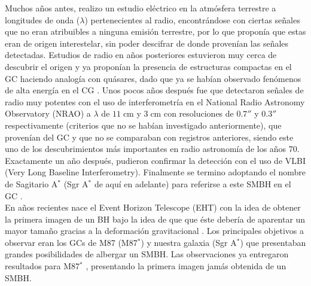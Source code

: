 \documentclass[11pt,letterpaper]{article}
\begin{document}
Muchos años antes, \cite{jansky1933electrical} realizo un estudio eléctrico en la atmósfera terrestre a longitudes de onda ($\lambda$) pertenecientes al radio, encontrándose con ciertas señales que no eran atribuibles a ninguna emisión terrestre, por lo que proponía que estas eran de origen interestelar, sin poder descifrar de donde provenían las señales detectadas. Estudios de radio en años posteriores estuvieron muy cerca de descubrir el origen \citep{clark, minley} y ya proponían la presencia de estructuras compactas en el GC haciendo analogía con quásares, dado que ya se habían observado fenómenos de alta energía en el CG \citep{lynden, lyndenress}. Unos pocos años después fue que \cite{balick1974intense} detectaron señales de radio muy potentes con el uso de interferometría en el National Radio Astronomy Observatory (NRAO) a $\lambda$ de $11\;\text{cm}$ y $3\;\text{cm}$ con resoluciones de $0.7''$ y $0.3''$ respectivamente (criterios que no se habían investigado anteriormente), que provenían del GC y que no se comparaban con registros anteriores, siendo este uno de los descubrimientos más importantes en radio astronomía de los años 70. Exactamente un año después, \cite{lo1} pudieron confirmar la detección con el uso de VLBI (Very Long Baseline Interferometry). Finalmente se termino adoptando el nombre de Sagitario A$^*$ (Sgr A$^*$ de aquí en adelante) para referirse a este SMBH en el GC \citep{brownestrella}.\\
En años recientes nace el Event Horizon Telescope (EHT) con la idea de obtener la primera imagen de un BH bajo la idea de que que éste debería de aparentar un mayor tamaño gracias a la deformación gravitacional \citep{campbell}. Los principales objetivos a observar eran los GCs de M87 (M87$^*$) y nuestra galaxia (Sgr A$^*$) que presentaban grandes posibilidades de albergar un SMBH. Las observaciones ya entregaron resultados para M87$^*$ \citep{2019ApJ...875L...2E}, presentando la primera imagen jamás obtenida de un SMBH.

\newpage

\end{document}
